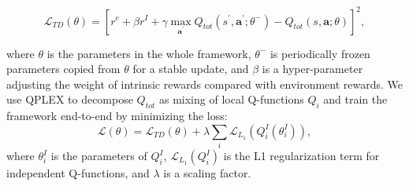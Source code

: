 \begin{equation}
    \mathcal{L}_{T D}(\theta) = \left[r^e+\beta r^I+\gamma \max _{\boldsymbol{a}^{\prime}} Q_{t o t}\left(s^{\prime}, \boldsymbol{a}^{\prime} ; \theta^{-}\right)-Q_{t o t}(s, \boldsymbol{a} ; \theta)\right]^{2},
    \label{Eq:TD}
\end{equation}

where $\theta$ is the parameters in the whole framework, $\theta^-$ is periodically frozen parameters copied from $\theta$ for a stable update, and $\beta$ is a hyper-parameter adjusting the weight of intrinsic rewards compared with environment rewards. We use QPLEX to decompose $Q_{tot}$ as mixing of local Q-functions $Q_i$ and train the framework end-to-end by minimizing the loss:
\begin{equation}
\mathcal{L(\theta)}=\mathcal{L}_{T D}(\theta)+\lambda \sum_i \mathcal{L}_{L_1}(Q^I_i(\theta^I_i)),
\label{eq:final_optimize}
\end{equation}
where $\theta^I_i$ is the parameters of $Q^I_i$, $\mathcal{L}_{L_1}(Q^I_i)$ is the L1 regularization term for independent Q-functions, and $\lambda$ is a scaling factor.





